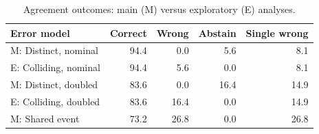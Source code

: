 \begin{table}[!htbp]
\caption{Agreement outcomes: main (M) versus exploratory (E) analyses.}
\label{tab:collision}
\centering\small
\begin{tabular}{lrrrr}
\toprule
Error model & Correct & Wrong & Abstain & Single wrong \\
\midrule
M: Distinct, nominal & 94.4 & 0.0 & 5.6 & 8.1 \\
E: Colliding, nominal & 94.4 & 5.6 & 0.0 & 8.1 \\
M: Distinct, doubled & 83.6 & 0.0 & 16.4 & 14.9 \\
E: Colliding, doubled & 83.6 & 16.4 & 0.0 & 14.9 \\
M: Shared event & 73.2 & 26.8 & 0.0 & 26.8 \\
\bottomrule
\end{tabular}
\end{table}
